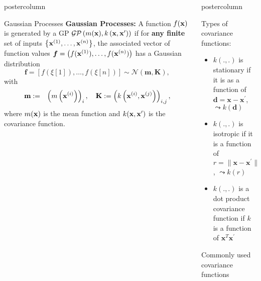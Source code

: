 \documentclass{beamer}
\newlength{\columnheight} %
\begin{document}
\begin{frame}[fragile]{}
\begin{columns}
\begin{column}{.31\textwidth}
\begin{beamercolorbox}[center]{postercolumn}
\begin{minipage}{.98\textwidth}
{\begin{myblock}{Gaussian Processes}
								\textbf{Gaussian Processes:} A function $f(\mathbf{x})$ is generated by a GP $\mathcal{GP}\left(m(\mathbf{x}), k\left(\mathbf{x}, \mathbf{x}^{\prime} \right) \right)$ if for \textbf{any finite} set of inputs $\left\{\mathbf{x}^{(1)}, \dots, \mathbf{x}^{(n)}\right\}$, the associated vector of function values $\bm{f} = \left(f(\mathbf{x}^{(1)}), \dots, f(\mathbf{x}^{(n)})\right)$ has a Gaussian distribution
								$$
								\bm{f} = \left[f\left(\xi[1]\right),\dots, f\left(\xi[n]\right)\right] \sim \mathcal{N}\left(\bm{m}, \bm{K}\right),
								$$
								with 
								\begin{eqnarray*}
									\textbf{m} &:=& \left(m\left(\mathbf{x}^{(i)}\right)\right)_{i}, \quad
									\textbf{K} := \left(k\left(\mathbf{x}^{(i)}, \mathbf{x}^{(j)}\right)\right)_{i,j}, 
								\end{eqnarray*}
								where $m(\mathbf{x})$ is the mean function and $k(\mathbf{x}, \mathbf{x}^\prime)$ is the covariance function. 
							
							\end{myblock}\vfill
						}
					\end{minipage}
				\end{beamercolorbox}
			\end{column}
			\begin{column}{.31\textwidth}
				\begin{beamercolorbox}[center]{postercolumn}
					\begin{minipage}{.98\textwidth}
						\parbox[t][\columnheight]{\textwidth}{
							\begin{myblock}{}  
								Types of covariance functions:
								\begin{itemize}
									\setlength{\itemindent}{+.3in}
									\item $k(.,.)$ is stationary if it is as a function of $\bm{d} = \bm{x} - \bm{x}^\prime$, $ \leadsto k(\bm{d})$
									\item $k(.,.)$ is isotropic if it is a function of $r = \|\bm{x} - \bm{x}^\prime\|$,  $ \leadsto k(r)$
									\item $k(., .)$ is a dot product covariance function if $k$ is a function of $\bm{x}^T \bm{x}^\prime$
								\end{itemize}
								Commonly used covariance functions
								

\end{myblock}}
\end{minipage}
\end{beamercolorbox}
\end{column}
\end{columns}
\end{frame}
\end{document}

